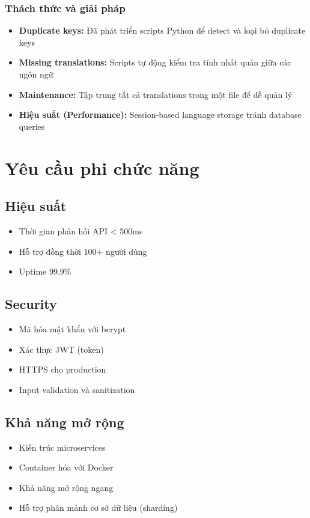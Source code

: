 \documentclass[12pt,a4paper]{report}
\begin{document}
    \subsubsection{Thách thức và giải pháp}
    \begin{itemize}
        \item \textbf{Duplicate keys:} Đã phát triển scripts Python để detect và loại bỏ duplicate keys
        \item \textbf{Missing translations:} Scripts tự động kiểm tra tính nhất quán giữa các ngôn ngữ
        \item \textbf{Maintenance:} Tập trung tất cả translations trong một file để dễ quản lý
        \item \textbf{Hiệu suất (Performance):} Session-based language storage tránh database queries
    \end{itemize}

    \section{Yêu cầu phi chức năng}

    \subsection{Hiệu suất}
    \begin{itemize}
        \item Thời gian phản hồi API < 500ms
        \item Hỗ trợ đồng thời 100+ người dùng
        \item Uptime 99.9\%
    \end{itemize}

    \subsection{Security}
    \begin{itemize}
        \item Mã hóa mật khẩu với bcrypt
    \item Xác thực JWT (token)
        \item HTTPS cho production
        \item Input validation và sanitization
    \end{itemize}

    \subsection{Khả năng mở rộng}
    \begin{itemize}
        \item Kiến trúc microservices
        \item Container hóa với Docker
    \item Khả năng mở rộng ngang
    \item Hỗ trợ phân mảnh cơ sở dữ liệu (sharding)
    \end{itemize}
\end{document}

